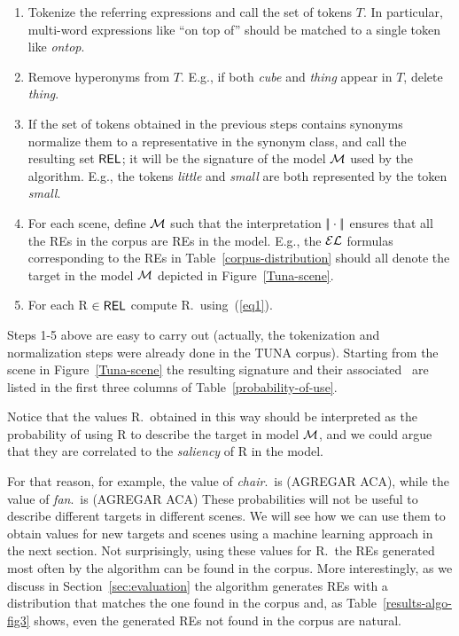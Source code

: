 \begin{enumerate}
\item Tokenize the referring expressions and call the set of tokens $T$. In particular, multi-word expressions like ``on top of'' 
should be matched to a single token like \emph{ontop}.

\item Remove hyperonyms from $T$. E.g., if both \emph{cube} and \emph{thing} appear in $T$, delete \emph{thing}.

\item If the set of tokens obtained in the previous steps contains synonyms normalize them to a representative in the synonym class, 
and call the resulting set $\textsf{REL}$; it will be the signature of the model $\mathcal{M}$ used by the algorithm. E.g., the tokens \emph{little} 
and \emph{small} are both represented by the token \emph{small}.

\item For each scene, define $\mathcal{M}$ such that the interpretation $|\!|\cdot|\!|$ ensures that all the REs in the corpus are REs in the model.
 E.g., the $\mathcal{EL}$ formulas corresponding to the REs in Table~\ref{corpus-distribution} should all denote the target in the model $\mathcal{M}$ 
depicted in 
Figure~\ref{Tuna-scene}.

\item For each R $\in \textsf{REL}$ compute R.\puse\ using~(\ref{eq1}).\\[-1.9em]

\end{enumerate}

Steps 1-5 above are easy to carry out (actually, the tokenization and normalization steps were already done in the TUNA corpus). 
Starting from the scene in Figure~\ref{Tuna-scene}
the resulting signature and their associated \puse\ are listed in the first three columns of Table~\ref{probability-of-use}. 

Notice that the values R.\puse\ obtained in this way should be interpreted as the probability of using R to describe the target in model 
$\mathcal{M}$, and we could argue that they are correlated to the \emph{saliency} of R in the model.  

For that reason, for example, the value of \emph{chair}.\puse\ is (AGREGAR ACA), while the value of \emph{fan}.\puse\ is (AGREGAR ACA)  
These probabilities will not be useful to describe different targets in different scenes. We will see how we can use them to obtain
 values for new targets and scenes using a machine learning approach in the next section. Not surprisingly, using these values for 
R.\puse\ the REs generated most often by the algorithm can be found in the corpus. More interestingly, as we discuss in 
Section~\ref{sec:evaluation} the algorithm generates REs with a distribution that matches the one found in the corpus and, 
as Table~\ref{results-algo-fig3} shows, even the generated REs not found in the corpus are natural.    


